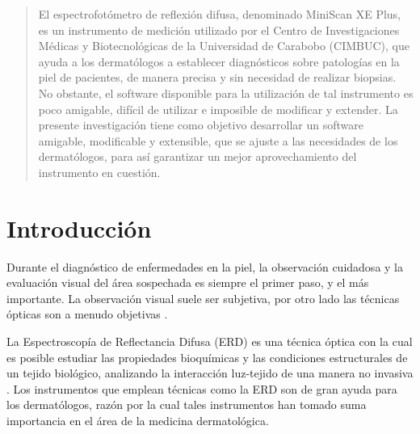 \documentclass[conference]{IEEEtran}
\begin{document}
\begin{abstract}
El espectrofot\'{o}metro de reflexi\'{o}n difusa, denominado MiniScan XE Plus, es un instrumento de medici\'{o}n utilizado por el Centro de Investigaciones M\'{e}dicas y Biotecnol\'{o}gicas de la Universidad de Carabobo (CIMBUC), que ayuda a los dermat\'{o}logos a establecer diagn\'{o}sticos sobre patolog\'{i}as en la piel de pacientes, de manera precisa y sin necesidad de realizar biopsias. No obstante, el software disponible para la utilizaci\'{o}n de tal instrumento es poco amigable, dif\'{i}cil de utilizar e imposible de modificar y extender. La presente investigaci\'{o}n tiene como objetivo desarrollar un software amigable, modificable y extensible, que se ajuste a las necesidades de los dermat\'{o}logos, para as\'{i} garantizar un mejor aprovechamiento del instrumento en cuesti\'{o}n.
\end{abstract}





%

\section{Introducci\'{o}n}

Durante el diagn\'{o}stico de enfermedades en la piel, la observaci\'{o}n cuidadosa y la evaluaci\'{o}n visual del \'{a}rea sospechada es siempre el primer paso, y el m\'{a}s importante. La observaci\'{o}n visual suele ser subjetiva, por otro lado las t\'{e}cnicas \'{o}pticas son a menudo objetivas \cite{Bersha}.

La Espectroscop\'{i}a de Reflectancia Difusa (ERD) es una t\'{e}cnica \'{o}ptica con la cual es  posible estudiar las propiedades bioqu\'{i}micas y las condiciones estructurales de un tejido biol\'{o}gico, analizando la interacci\'{o}n luz-tejido de una manera no invasiva \cite{Perez}. Los instrumentos que emplean t\'{e}cnicas como la ERD son de gran ayuda para los dermat\'{o}logos, raz\'{o}n por la cual tales instrumentos han tomado suma importancia en el \'{a}rea de la medicina dermatol\'{o}gica.
\end{document}
